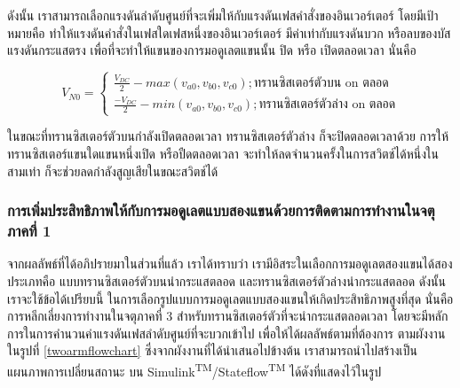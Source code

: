 \documentclass[11pt,a4paper]{article}
\begin{document}
ดังนั้น เราสามารถเลือกแรงดันลำดับศูนย์ที่จะเพิ่มให้กับแรงดันเฟสคำสั่งของอินเวอร์เตอร์ โดยมีเป้าหมายคือ ทำให้แรงดันคำสั่งในเฟสใดเฟสหนึ่งของอินเวอร์เตอร์ มีค่าเท่ากับแรงดันบวก หรือลบของบัสแรงดันกระแสตรง เพื่อที่จะทำให้แขนของการมอดูเลตแขนนั้น ปิด หรือ เปิดตลอดเวลา นั่นคือ

\begin{equation}
    V_{N0} = \begin{cases}
        \frac{V_{DC}}{2}-max(v_{a0},v_{b0},v_{c0}); \text{ทรานซิสเตอร์ตัวบน on ตลอด} \\
        \frac{-V_{DC}}{2}-min(v_{a0},v_{b0},v_{c0}); \text{ทรานซิสเตอร์ตัวล่าง on ตลอด}
    \end{cases}
\end{equation}

ในขณะที่ทรานซิสเตอร์ตัวบนกำลังเปิดตลอดเวลา ทรานซิสเตอร์ตัวล่าง ก็จะปิดตลอดเวลาด้วย การให้ทรานซิสเตอร์แขนใดแขนหนึ่งเปิด หรือปืดตลอดเวลา จะทำให้ลดจำนวนครั้งในการสวิตช์ได้หนึ่งในสามเท่า ก็จะช่วยลดกำลังสูญเสียในขณะสวิตช์ได้

\subsubsection{การเพิ่มประสิทธิภาพให้กับการมอดูเลตแบบสองแขนด้วยการติดตามการทำงานในจตุภาคที่ 1}

จากผลลัพธ์ที่ได้อภิปรายมาในส่วนที่แล้ว เราได้ทราบว่า เรามีอิสระในเลือกการมอดูเลตสองแขนได้สองประเภทคือ แบบทรานซิสเตอร์ตัวบนนำกระแสตลอด และทรานซิสเตอร์ตัวล่างนำกระแสตลอด ดังนั้น เราจะใช้ข้อได้เปรียบนี้ ในการเลือกรูปแบบการมอดูเลตแบบสองแขนให้เกิดประสิทธิภาพสูงที่สุด นั่นคือ การหลีกเลี่ยงการทำงานในจตุภาคที่ 3 สำหรับทรานซิสเตอร์ตัวที่จะนำกระแสตลอดเวลา โดยจะมีหลักการในการคำนวนค่าแรงดันเฟสลำดับศูนย์ที่จะบวกเข้าไป เพื่อให้ได้ผลลัพธ์ตามที่ต้องการ ตามผังงานในรูปที่ \ref{twoarmflowchart} ซึ่งจากผังงานที่ได้นำเสนอไปข้างต้น เราสามารถนำไปสร้างเป็นแผนภาพการเปลี่ยนสถานะ บน Simulink\textsuperscript{TM}/Stateflow\textsuperscript{TM} ได้ดังที่แสดงไว้ในรูป
\end{document}

